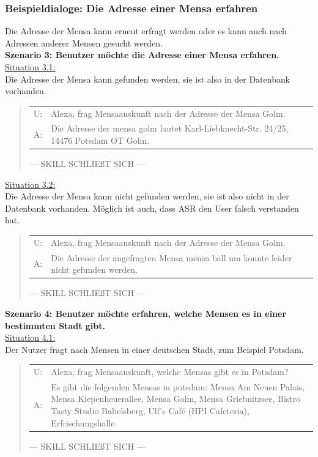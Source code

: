 \documentclass[12pt]{article}
\begin{document}
\subsubsection{Beispieldialoge: Die Adresse einer Mensa erfahren}
Die Adresse der Mensa kann erneut erfragt werden oder es kann auch nach Adressen anderer Mensen gesucht werden.\\

\textbf{Szenario 3: Benutzer möchte die Adresse einer Mensa erfahren.}\\
\ul{Situation 3.1:}\\Die Adresse der Mensa kann gefunden werden, sie ist also in der Datenbank vorhanden.
\begin{quote}
\begin{tabular}{lp{12cm}}
  U:& Alexa, frag Mensaauskunft nach der Adresse der Mensa Golm.\\
  A:& Die Adresse der mensa golm lautet Karl-Liebknecht-Str. 24/25, 14476 Potsdam OT Golm.\\[0.2cm]
\end{tabular}
--- SKILL SCHLIEßT SICH ---\\
\end{quote}

\ul{Situation 3.2:}\\Die Adresse der Mensa kann nicht gefunden werden, sie ist also nicht in der Datenbank vorhanden. Möglich ist auch, dass ASR den User falsch verstanden hat.
\begin{quote}
\begin{tabular}{lp{12cm}}
  U:& Alexa, frag Mensaauskunft nach der Adresse der Mensa Golm.\\
  A:& Die Adresse der angefragten Mensa mensa ball um konnte leider nicht gefunden werden.\\[0.2cm] 
\end{tabular}
--- SKILL SCHLIEßT SICH ---\\
\end{quote}

\textbf{Szenario 4: Benutzer möchte erfahren, welche Mensen es in einer bestimmten Stadt gibt.}\\
\ul{Situation 4.1:}\\Der Nutzer fragt nach Mensen in einer deutschen Stadt, zum Beispiel Potsdam.
\begin{quote}
\begin{tabular}{lp{12cm}}
  U:& Alexa, frag Mensaauskunft, welche Mensas gibt es in Potsdam?\\
  A:& Es gibt die folgenden Mensas in potsdam: Mensa Am Neuen Palais, Mensa Kiepenheuerallee, Mensa Golm, Mensa Griebnitzsee, Bistro Tasty Studio Babelsberg, Ulf's Café (HPI Cafeteria), Erfrischungshalle.\\[0.2cm]
\end{tabular}
--- SKILL SCHLIEßT SICH ---\\
\end{quote}
\end{document}
